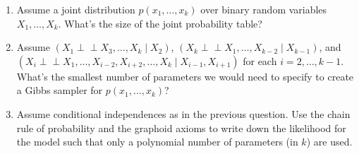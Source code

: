 \documentclass[11pt]{article}
\begin{document}
\begin{enumerate}
\item Assume a joint distribution $p(x_1, \ldots, x_k)$ over binary random variables $X_1, \ldots, X_k$.
What's the size of the joint probability table?\\
\begin{answertext}{3cm}{}


\end{answertext}

\item Assume $(X_1 {\perp\!\!\!\perp} X_3, \ldots, X_k \mid X_2)$, $(X_k {\perp\!\!\!\perp} X_1, \ldots, X_{k-2} \mid X_{k-1})$, and $(X_i {\perp\!\!\!\perp} X_1, \ldots, X_{i-2}, X_{i+2}, \ldots, X_k \mid X_{i-1}, X_{i+1})$ for each $i = 2, \ldots, k-1$.  What's the smallest number of parameters we would need to specify to create a Gibbs sampler for $p(x_1, \ldots, x_k)$?\\
\begin{answertext}{6cm}{}


\end{answertext}

\item Assume conditional independences as in the previous question.  Use the chain rule of probability and the graphoid axioms to write down the likelihood for the model such that only a polynomial number of parameters (in $k$) are used.\\
\begin{answertext}{6cm}{}


\end{answertext} 
\end{enumerate}
\end{document}
